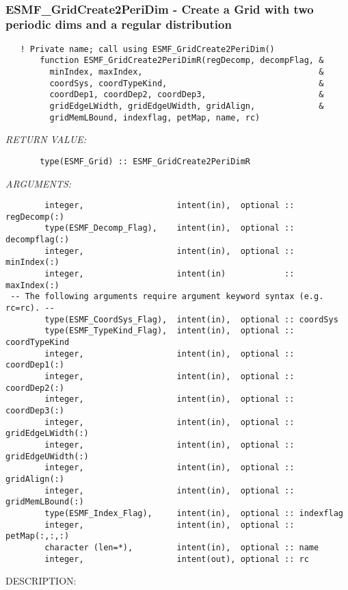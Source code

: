  
\mbox{}\hrulefill\ 
 
\subsubsection [ESMF\_GridCreate2PeriDim] {ESMF\_GridCreate2PeriDim - Create a Grid with two periodic dims and a regular distribution}


 
\begin{verbatim}   ! Private name; call using ESMF_GridCreate2PeriDim()
       function ESMF_GridCreate2PeriDimR(regDecomp, decompFlag, &
         minIndex, maxIndex,                                    &
         coordSys, coordTypeKind,                               &
         coordDep1, coordDep2, coordDep3,                       &
         gridEdgeLWidth, gridEdgeUWidth, gridAlign,             &
         gridMemLBound, indexflag, petMap, name, rc)
 \end{verbatim}{\em RETURN VALUE:}
\begin{verbatim}       type(ESMF_Grid) :: ESMF_GridCreate2PeriDimR\end{verbatim}{\em ARGUMENTS:}
\begin{verbatim}        integer,                   intent(in),  optional :: regDecomp(:)
        type(ESMF_Decomp_Flag),    intent(in),  optional :: decompflag(:)
        integer,                   intent(in),  optional :: minIndex(:)
        integer,                   intent(in)            :: maxIndex(:)
 -- The following arguments require argument keyword syntax (e.g. rc=rc). --
        type(ESMF_CoordSys_Flag),  intent(in),  optional :: coordSys
        type(ESMF_TypeKind_Flag),  intent(in),  optional :: coordTypeKind
        integer,                   intent(in),  optional :: coordDep1(:)
        integer,                   intent(in),  optional :: coordDep2(:)
        integer,                   intent(in),  optional :: coordDep3(:)
        integer,                   intent(in),  optional :: gridEdgeLWidth(:)
        integer,                   intent(in),  optional :: gridEdgeUWidth(:)
        integer,                   intent(in),  optional :: gridAlign(:)
        integer,                   intent(in),  optional :: gridMemLBound(:)
        type(ESMF_Index_Flag),     intent(in),  optional :: indexflag
        integer,                   intent(in),  optional :: petMap(:,:,:)
        character (len=*),         intent(in),  optional :: name
        integer,                   intent(out), optional :: rc\end{verbatim}
{\sf DESCRIPTION:\\ }



